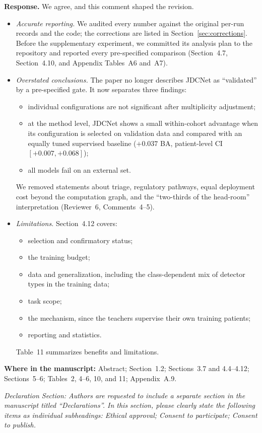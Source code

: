 \documentclass[11pt]{article}
\newenvironment{rcomment}{\par\noindent\begin{minipage}{\linewidth}\itshape\color{black!75}}{\end{minipage}\par}
\newcommand{\where}[1]{\par\noindent\textbf{Where in the manuscript:} #1\par}
\begin{document}
\textbf{Response.} We agree, and this comment shaped the revision.
\begin{itemize}[leftmargin=1.4em]
  \item \emph{Accurate reporting.} We audited every number against the original per-run records and the code; the corrections are listed in Section~\ref{sec:corrections}. Before the supplementary experiment, we committed its analysis plan to the repository and reported every pre-specified comparison (Section~4.7, Section~4.10, and Appendix Tables~A6 and~A7).
  \item \emph{Overstated conclusions.} The paper no longer describes JDCNet as ``validated'' by a pre-specified gate. It now separates three findings:
  \begin{itemize}[leftmargin=1.2em]
    \item individual configurations are not significant after multiplicity adjustment;
    \item at the method level, JDCNet shows a small within-cohort advantage when its configuration is selected on validation data and compared with an equally tuned supervised baseline ($+0.037$ BA, patient-level CI $[+0.007,+0.068]$);
    \item all models fail on an external set.
  \end{itemize}
  We removed statements about triage, regulatory pathways, equal deployment cost beyond the computation graph, and the ``two-thirds of the head-room'' interpretation (Reviewer~6, Comments~4--5).
  \item \emph{Limitations.} Section~4.12 covers:
  \begin{itemize}[leftmargin=1.2em]
    \item selection and confirmatory status;
    \item the training budget;
    \item data and generalization, including the class-dependent mix of detector types in the training data;
    \item task scope;
    \item the mechanism, since the teachers supervise their own training patients;
    \item reporting and statistics.
  \end{itemize}
  Table~11 summarizes benefits and limitations.
\end{itemize}
\where{Abstract; Section~1.2; Sections~3.7 and 4.4--4.12; Sections~5--6; Tables~2, 4--6, 10, and 11; Appendix~A.9.}

\begin{rcomment}
Declaration Section: Authors are requested to include a separate section in the manuscript titled ``Declarations''. In this section, please clearly state the following items as individual subheadings: Ethical approval; Consent to participate; Consent to publish.
\end{rcomment}
\end{document}
